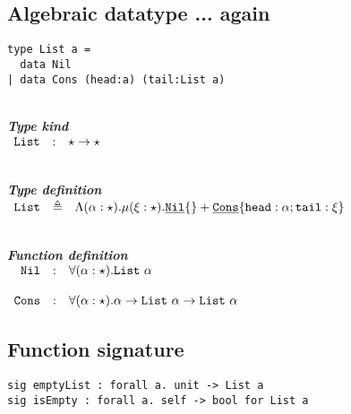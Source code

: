 \documentclass{article}[11pt]
\newcommand{\subsubsubsection}[1]
{
    ~\\
    {\bf {\em #1}} \\
}
\newcommand{\term}[1]{\verb~#1~}
\newcommand{\cons}[1]{\underline{\verb~#1~}}
\begin{document}
    \subsection{Algebraic datatype ... again}

    \begin{verbatim}
type List a =
  data Nil
| data Cons (head:a) (tail:List a)
    \end{verbatim}

    \subsubsubsection{Type kind}

    \noindent
    \begin{math}
        \begin{array}{rclp{5cm}}
            \term{List} & : & \star \rightarrow \star
        \end{array}
    \end{math}

    \subsubsubsection{Type definition}

    \noindent
    \begin{math}
        \begin{array}{rclp{5cm}}
            \term{List} & \triangleq & \Lambda(\alpha:\star).\mu(\xi:\star).\cons{Nil}\{\} + \cons{Cons}\{ \term{head} :\alpha; \term{tail} : \xi \}
        \end{array}
    \end{math}

    \subsubsubsection{Function definition}

    \noindent
    \begin{math}
        \begin{array}{rclp{5cm}}
            \term{Nil}  & : & \forall(\alpha:\star).\term{List} ~ \alpha                                                   \\                                                                                    \\
            \term{Cons} & : & \forall(\alpha:\star).\alpha \rightarrow \term{List}~\alpha \rightarrow \term{List} ~ \alpha
        \end{array}
    \end{math}

    \subsection{Function signature}\label{subsec:function-signature}

    \begin{verbatim}
sig emptyList : forall a. unit -> List a
sig isEmpty : forall a. self -> bool for List a
    \end{verbatim}
\end{document}
